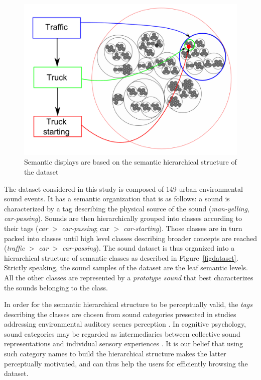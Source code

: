 \documentclass{aes2e}
\begin{document}
\begin{figure}[t]
\begin{center}
\includegraphics[scale=0.24]{gfx/SSF.pdf} 
\end{center}
\caption{\label{figSSF} Semantic displays are  based on the semantic hierarchical structure of the dataset}
\end{figure}


The dataset considered in this study is composed of 149 urban environmental sound events. It has a semantic organization that is as follows: a sound is characterized by a tag describing the physical source of the sound (\textit{man-yelling}, \textit{car-passing}). Sounds are then hierarchically grouped into classes according to their tags (\textit{car} $>$ \textit{car-passing}; car $>$ \textit{car-starting}). Those classes are in turn  packed into classes until high level classes describing broader concepts are reached (\textit{traffic} $>$ \textit{car} $>$ \textit{car-passing}). The sound dataset is thus organized into a hierarchical structure of semantic classes as described in Figure~\ref{figdataset}. Strictly speaking, the sound samples of the dataset are the leaf semantic levels. All the other classes are represented by a \textit{prototype sound} that best characterizes the sounds belonging to the class. 

In order for the semantic hierarchical structure to be perceptually valid, the \textit{tags} describing the classes  are chosen from sound categories presented in studies addressing environmental auditory scenes perception \cite{niessen2010categories, brown2011towards, dubois2006cognitive}. In cognitive psychology, sound categories may be regarded as intermediaries between collective sound representations and individual sensory experiences \cite{dubois2006cognitive}. It is our belief that using such category names to build the hierarchical structure makes the latter perceptually motivated, and can thus help the users for efficiently browsing the dataset.
\end{document}
